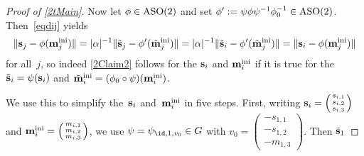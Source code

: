 \documentclass[reqno]{amsart}
\begin{document}
\begin{proof}[Proof of \cref{2tMain}]
  Now let $\phi \in \operatorname{ASO}(2)$ and set
  $\phi' := \psi \phi \psi^{-1} \phi_0^{-1} \in
  \operatorname{ASO}(2)$. Then~\eqref{eqdij} yields
  \[
    \lVert\mathbf{s}_j - \phi(\mathbf{m}_j^{\operatorname{ini}})\rVert = |\alpha|^{-1}
    \lVert\tilde{\mathbf{s}}_j - \phi'(\tilde{\mathbf{m}}_j^{\operatorname{ini}})\rVert =
    |\alpha|^{-1} \lVert\tilde{\mathbf{s}}_i - \phi'(\tilde{\mathbf{m}}_j^{\operatorname{ini}})\rVert = \lVert\mathbf{s}_i - \phi(\mathbf{m}_j^{\operatorname{ini}})\rVert
  \]
  for all~$j$, so indeed \cref{2Claim2} follows for the $\mathbf{s}_i$ and
  $\mathbf{m}_i^{\operatorname{ini}}$ if it is true for the
  $\tilde{\mathbf{s}}_i = \psi(\mathbf{s}_i)$ and
  $\tilde{\mathbf{m}}_i^{\operatorname{ini}} = (\phi_0 \circ \psi)(\mathbf{m}_i^{\operatorname{ini}})$.

  We use this to simplify the~$\mathbf{s}_i$ and~$\mathbf{m}_i^{\operatorname{ini}}$ in five
  steps.
  First, writing
  $\mathbf{s}_i = \left(\begin{smallmatrix} s_{i,1} \\ s_{i,2} \\
      s_{i,3}\end{smallmatrix}\right)$ and $\mathbf{m}_i^{\operatorname{ini}} =
  \left(\begin{smallmatrix} m_{i,1} \\ m_{i,2} \\
      m_{i,3}\end{smallmatrix}\right)$, we use
  $\psi = \psi_{\id,1,v_0} \in G$ with
  $v_0 = \left(\begin{smallmatrix} - s_{1,1} \\ - s_{1,2} \\ -
      m_{1,3}\end{smallmatrix}\right)$. Then $\tilde{\mathbf{s}}_1$

\end{proof}
\end{document}
